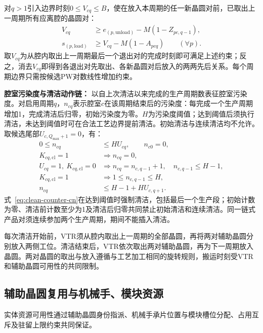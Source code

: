 \documentclass[final,5p,times,twocolumn]{elsarticle}
\begin{document}
对$q>1$引入边界时刻$0\le V_{cq}\le B$，使在放入本周期的任一新晶圆对前，已取出上一周期所有应离腔的晶圆对：
\begin{equation}
\begin{aligned}
V_{cq}&\ge e_{(p,\mathrm{unload})}-M(1-Z_{pc,q-1}),\\
s_{(p,\mathrm{load})}&\ge V_{cq}-M(1-A_{pcq})\qquad(\forall p).
\end{aligned}
\label{eq:cycle-exchange-cn}
\end{equation}
取$V_{cq}$为从腔内取出上一周期最后一个退出对的完成时刻即可满足上述约束；反之，消去$V_{cq}$即得到各退出对先取出、各新晶圆对后放入的两两先后关系。每个周期边界只需按候选PW对数线性增加约束。

\noindent\textbf{腔室污染度与清洁动作链：}
以自上次清洁以来完成的生产周期数表征腔室污染度。对启用周期$q$，$n_{cq}$表示腔室$c$在该周期结束后的污染度：每完成一个生产周期增加1，完成清洁后归零，初始污染度为零。$H$为污染度阈值；达到阈值后须执行清洁，未达到阈值时可在合法工艺边界提前清洁。初始清洁与连续清洁均不允许。
取候选尾部$U_{c,Q_{\max}+1}=0$，有：
\begin{equation}
\begin{aligned}
0\le n_{cq}&\le H U_{cq},\qquad n_{c0}=0,\\
K_{cq,\mathrm{cl}}=1&\Rightarrow n_{cq}=0,\\
U_{cq}=1,\ K_{cq,\mathrm{cl}}=0
&\Rightarrow n_{cq}=n_{c,q-1}+1,\quad n_{c,q-1}\le H-1,\\
K_{cq,\mathrm{cl}}=1&\Rightarrow 1\le n_{c,q-1}\le H,\\
n_{cq}&\le H-1+H U_{c,q+1}.
\end{aligned}
\label{eq:clean-counter-cn}
\end{equation}
式~\eqref{eq:clean-counter-cn}在达到阈值时强制清洁，包括最后一个生产段；初始计数为零、清洁前计数至少为1及清洁后归零共同禁止初始清洁和连续清洁。同一链式产品对须连续参加两个生产周期，期间不能插入清洁。

每次清洁开始前，VTR须从腔内取出上一周期的全部晶圆，再将两对辅助晶圆分别放入两侧工位。清洁结束后，VTR依次取出两对辅助晶圆，再为下一周期放入晶圆。两对晶圆的取出与放入遵循与工艺加工相同的旋转规则，搬运时刻受VTR和辅助晶圆可用性的共同限制。

\subsection{辅助晶圆复用与机械手、模块资源}
\label{sec:model-resource-cn}

实体资源可用性通过辅助晶圆身份指派、机械手承片位置与模块槽位分配、占用互斥及驻留上限约束共同保证。
\end{document}

